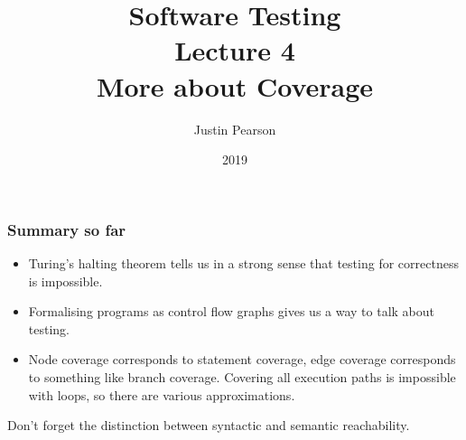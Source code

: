 \documentclass[handout]{beamer}
\title{Software Testing\\ Lecture 4\\ More about Coverage}
\author{Justin Pearson}
\date{2019}
\begin{document}
\lstset{language=C}

\begin{frame}
  \maketitle
\end{frame}

\begin{frame}
  \frametitle{Summary so far}
  \begin{itemize}
  \item Turing's halting theorem tells us in a strong sense that testing
    for correctness is impossible.
  \item Formalising programs as control flow graphs gives us a way to talk
    about testing.
  \item Node coverage corresponds to statement coverage, edge coverage
    corresponds to something like branch coverage. Covering all execution
    paths is impossible with loops, so there are various approximations.
  \end{itemize}
  Don't forget the distinction between syntactic and semantic reachability. 
\end{frame}
\end{document}
